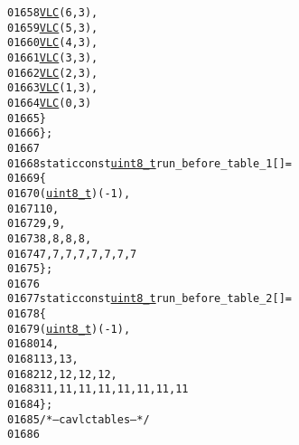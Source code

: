 \begin{footnotesize}
\begin{alltt}
01658                 \hyperlink{vlc_8h_a7f3572774a720fd9b4bc3b1a0b65082f}{VLC}(6, 3),
01659                 \hyperlink{vlc_8h_a7f3572774a720fd9b4bc3b1a0b65082f}{VLC}(5, 3),
01660                 \hyperlink{vlc_8h_a7f3572774a720fd9b4bc3b1a0b65082f}{VLC}(4, 3),
01661                 \hyperlink{vlc_8h_a7f3572774a720fd9b4bc3b1a0b65082f}{VLC}(3, 3),
01662                 \hyperlink{vlc_8h_a7f3572774a720fd9b4bc3b1a0b65082f}{VLC}(2, 3),
01663                 \hyperlink{vlc_8h_a7f3572774a720fd9b4bc3b1a0b65082f}{VLC}(1, 3),
01664                 \hyperlink{vlc_8h_a7f3572774a720fd9b4bc3b1a0b65082f}{VLC}(0, 3)
01665         \}
01666 \};
01667 
01668 \textcolor{keyword}{static} \textcolor{keyword}{const} \hyperlink{_types_8h_a363e4d606232036a6b89060813c45489}{uint8_t} run\_before\_table\_1[] =
01669 \{
01670         (\hyperlink{_types_8h_a363e4d606232036a6b89060813c45489}{uint8_t})(-1),
01671         10,
01672         9, 9,
01673         8, 8, 8, 8,
01674         7, 7, 7, 7, 7, 7, 7, 7
01675 \};
01676 
01677 \textcolor{keyword}{static} \textcolor{keyword}{const} \hyperlink{_types_8h_a363e4d606232036a6b89060813c45489}{uint8_t} run\_before\_table\_2[] =
01678 \{
01679         (\hyperlink{_types_8h_a363e4d606232036a6b89060813c45489}{uint8_t})(-1),
01680         14,
01681         13, 13,
01682         12, 12, 12, 12,
01683         11, 11, 11, 11, 11, 11, 11, 11
01684 \};
01685 \textcolor{comment}{/* -- cavlc tables -- */}
01686 
\end{alltt}\end{footnotesize}
